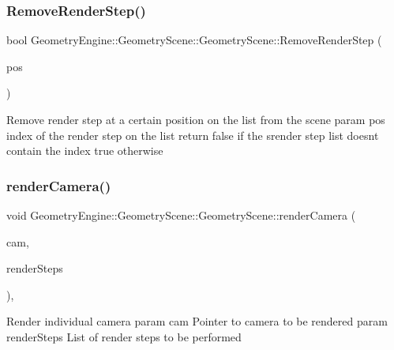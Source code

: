 \subsubsection{\texorpdfstring{RemoveRenderStep()}{RemoveRenderStep()}}
{\footnotesize\ttfamily bool Geometry\+Engine\+::\+Geometry\+Scene\+::\+Geometry\+Scene\+::\+Remove\+Render\+Step (\begin{DoxyParamCaption}\item[{int}]{pos }\end{DoxyParamCaption})\hspace{0.3cm}{\ttfamily [virtual]}}

Remove render step at a certain position on the list from the scene param pos index of the render step on the list return false if the srender step list doesn\textquotesingle{}t contain the index true otherwise \mbox{\label{class_geometry_engine_1_1_geometry_scene_1_1_geometry_scene_aef0be95a28a24292c03bf1138e246439}} 
\subsubsection{\texorpdfstring{renderCamera()}{renderCamera()}}
{\footnotesize\ttfamily void Geometry\+Engine\+::\+Geometry\+Scene\+::\+Geometry\+Scene\+::render\+Camera (\begin{DoxyParamCaption}\item[{\mbox{\hyperlink{class_geometry_engine_1_1_geometry_world_item_1_1_geometry_camera_1_1_camera}{Geometry\+World\+Item\+::\+Geometry\+Camera\+::\+Camera}} $\ast$}]{cam,  }\item[{const std\+::list$<$ \mbox{\hyperlink{class_geometry_engine_1_1_geometry_render_step_1_1_render_step}{Geometry\+Render\+Step\+::\+Render\+Step}} $\ast$ $>$ \&}]{render\+Steps }\end{DoxyParamCaption})\hspace{0.3cm}{\ttfamily [protected]}, {\ttfamily [virtual]}}

Render individual camera param cam Pointer to camera to be rendered param render\+Steps List of render steps to be performed \mbox{\label{class_geometry_engine_1_1_geometry_scene_1_1_geometry_scene_ad4bc76248a37e0a16edff30fe52a29cc}} 
